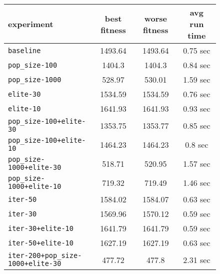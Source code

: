 \begin{figure}[htb]
	\centering
	
	\begin{tabular}{lccc}
		\toprule
		\textbf{experiment} & \textbf{best fitness} & \textbf{worse fitness} & \textbf{avg run time} \\
		\midrule
			\texttt{baseline 						}	&    1493.64 &               1493.64 &                 0.75 sec \\
		\texttt{pop\_size-100 					}	&      1404.3 &                1404.3 &                 0.84 sec \\
		\texttt{pop\_size-1000 					}	&      528.97 &                530.01 &                 1.59 sec \\
		\texttt{elite-30 						}	&    1534.59 &               1534.59 &                 0.76 sec \\
		\texttt{elite-10 						}	&    1641.93 &               1641.93 &                 0.93 sec \\
		\texttt{pop\_size-100+elite-30 			}	&     1353.75 &               1353.77 &                 0.85 sec \\
		\texttt{pop\_size-100+elite-10 			}	&     1464.23 &               1464.23 &                  0.8 sec \\
		\texttt{pop\_size-1000+elite-30 		}	&      518.71 &                520.95 &                 1.57 sec \\
		\texttt{pop\_size-1000+elite-10 		}	&      719.32 &                719.49 &                 1.46 sec \\
		\texttt{iter-50 						}	&    1584.02 &               1584.07 &                 0.63 sec \\
		\texttt{iter-30 						}	&    1569.96 &               1570.12 &                 0.59 sec \\
		\texttt{iter-30+elite-10 				}	&    1641.79 &               1641.79 &                 0.59 sec \\
		\texttt{iter-50+elite-10 				}	&    1627.19 &               1627.19 &                 0.63 sec \\
		\texttt{iter-200+pop\_size-1000+elite-30} 	&      477.72 &                 477.8 &                 2.31 sec \\
		\bottomrule
	\end{tabular}
	\label{tab:cmeas-performance-r}
\end{figure}

		